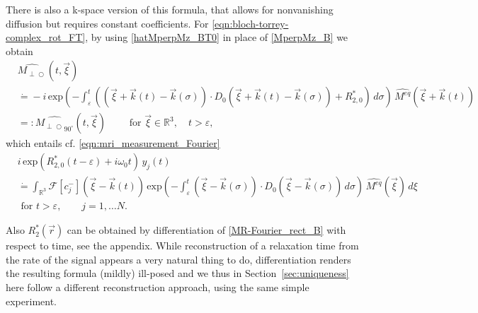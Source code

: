 \documentclass{ws-m3as}
\newcommand{\kspace}[1]{{#1}}
\def\Mpp{M_{\perp\!\!\!\!\!\bigcirc}}
\def\Mphp{\widehat{\Mpp}}
\newcommand\taup{\varepsilon}
\newcommand{\eexp}[1]{\text{exp}\left(#1\right)}
\begin{document}
\kspace{
There is also a k-space version of this formula, that allows for nonvanishing diffusion but requires constant coefficients. For \eqref{eqn:bloch-torrey-complex_rot_FT}, by using \eqref{hatMperpMz_BT0} in place of \eqref{MperpMz_B} we obtain
\begin{equation}\label{Mperp_ex_90_rect_BT0}
\begin{aligned}
&\Mphp(t,\vec\xi)\\
&\dot{=}
-i\,\eexp{-\int_{\taup}^t((\vec\xi+\vec k(t)-\vec k(\sigma))\cdot D_0(\vec\xi+\vec k(t)-\vec k(\sigma))+R_{2,0}^*)\, d\sigma}\,\widehat{M^{eq}}(\vec\xi+\vec k(t))
\\
&=:\widehat{{\Mpp}_{90^\circ}}(t,\vec\xi)\qquad
\text{ for }\vec\xi\in\mathbb{R}^3, \quad t>\taup,
\end{aligned}
\end{equation}
which 
entails cf. \eqref{eqn:mri_measurement_Fourier}
\begin{equation}\label{MR-Fourier_rect_BT0} 
\begin{aligned}
&i\,\eexp{R_{2,0}^*(t-\taup)+ i\omega_0t} \, y_j(t) \\
&\dot{=} 
\int_{\mathbb{R}^3}
\mathcal{F}[c_j^-](\vec\xi-\vec k(t))\,
\eexp{-\int_{\taup}^t(\vec\xi-\vec k(\sigma))\cdot D_0(\vec\xi-\vec k(\sigma))\, d\sigma}\,\widehat{M^{eq}}(\vec\xi)\, d\xi\\
&\text{ for }t>\taup,\qquad j=1,\ldots N.
\end{aligned}
\end{equation}
}

\smallskip

Also $R_2^*(\vec r)$ can be obtained by differentiation of \eqref{MR-Fourier_rect_B} with respect to time, see the appendix. 
While reconstruction of a relaxation time from the rate of the signal appears a very natural thing to do, differentiation renders the resulting formula (mildly) ill-posed and we thus in Section~\ref{sec:uniqueness} here follow a different reconstruction approach, using the same simple experiment.   
\end{document}
